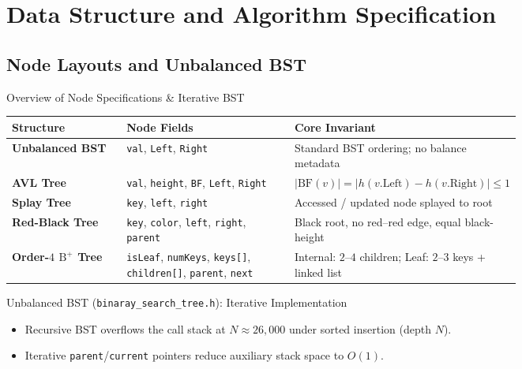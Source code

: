 \documentclass[aspectratio=169, 10pt, xcolor={x11names}]{beamer}
\newcommand{\code}[1]{\texttt{\color{primary!90!black}#1}}
\newcommand{\bfactor}[1]{\ensuremath{\mathrm{BF}(#1)}}
\begin{document}
\section{Data Structure and Algorithm Specification}

\subsection{Node Layouts and Unbalanced BST}
\begin{frame}{Overview of Node Specifications \& Iterative BST}
\renewcommand{\arraystretch}{1.22}
\footnotesize
\begin{tabular}{@{}l>{\raggedright\arraybackslash}p{0.33\linewidth}>{\raggedright\arraybackslash}p{0.42\linewidth}@{}}
\toprule
\textbf{\color{primary}Structure} & \textbf{\color{primary}Node Fields} & \textbf{\color{primary}Core Invariant} \\
\midrule
\textbf{Unbalanced BST} & \code{val}, \code{Left}, \code{Right} & Standard BST ordering; no balance metadata \\
\textbf{AVL Tree} & \code{val}, \code{height}, \code{BF}, \code{Left}, \code{Right} & $|\bfactor{v}| = |h(v.\text{Left}) - h(v.\text{Right})| \le 1$ \\
\textbf{Splay Tree} & \code{key}, \code{left}, \code{right} & Accessed / updated node splayed to root \\
\textbf{Red-Black Tree} & \code{key}, \code{color}, \code{left}, \code{right}, \code{parent} & Black root, no red--red edge, equal black-height \\
\textbf{Order-$4$ $\text{B}^+$ Tree} & \code{isLeaf}, \code{numKeys}, \code{keys[]}, \code{children[]}, \code{parent}, \code{next} & Internal: $2\text{--}4$ children; Leaf: $2\text{--}3$ keys + linked list \\
\bottomrule
\end{tabular}

\vspace{0.6em}
\begin{alertblock}{Unbalanced BST (\texttt{binaray\_search\_tree.h}): Iterative Implementation}
\footnotesize
\begin{itemize}
  \item Recursive BST overflows the call stack at $N \approx 26{,}000$ under sorted insertion (depth $N$).
  \item Iterative \code{parent}/\code{current} pointers reduce auxiliary stack space to \textbf{$O(1)$}.
\end{itemize}
\end{alertblock}
\end{frame}
\end{document}
